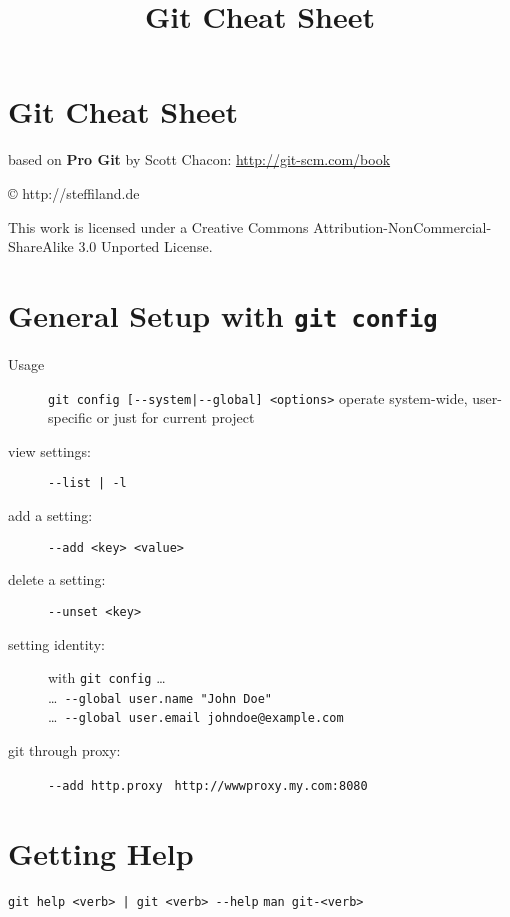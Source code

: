 \documentclass[a4paper,notumble]{leaflet} %
\begin{document}
\author{} %
\date{\theyear}  %
\title{Git Cheat Sheet}
\section{{\LARGE Git Cheat Sheet}}
\begin{scriptsize}
based on \textbf{Pro Git} by Scott Chacon: \url{http://git-scm.com/book}

\copyright{} \the\year{} http://steffiland.de

\href{http://creativecommons.org/licenses/by-nc-sa/3.0/}{\byncsa} This work is licensed under a Creative Commons Attribution-NonCommercial-ShareAlike 3.0 Unported License.
\end{scriptsize}
\section{General Setup with \texttt{git config}}
\begin{description}
\item[Usage] \verb!git config [--system|--global] <options>! operate system-wide, user-specific or just for current project
\item[view settings:] \verb!--list | -l!
\item[add a setting:] \verb!--add <key> <value>!
\item[delete a setting:] \verb!--unset <key>!
\item[setting identity:] with \verb|git config| \dots\\
	\dots \, \verb|--global user.name "John Doe"| \\
	\dots \, \verb|--global user.email johndoe@example.com|
\item[git through proxy:] \verb!--add http.proxy!
	\verb! http://wwwproxy.my.com:8080!
\end{description}

\section{Getting Help}
\verb!git help <verb> | git <verb> --help!
\verb!man git-<verb>!
\end{document}
